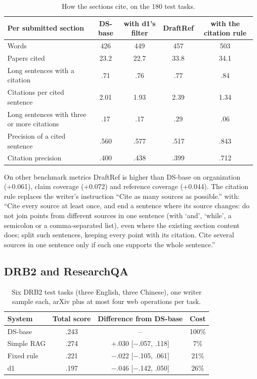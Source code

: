 \documentclass[11pt, letterpaper]{article}
\newcommand{\n}{$-$}
\begin{document}
\begin{table}[H]
\centering\footnotesize\setlength{\tabcolsep}{3pt}
\begin{tabular}{lcccc}
\toprule
Per submitted section & DS-base & with d1's filter & DraftRef & with the citation rule\\
\midrule
Words & 426 & 449 & 457 & 503\\
Papers cited & 23.2 & 22.7 & 33.8 & 34.1\\
Long sentences with a citation & .71 & .76 & .77 & .84\\
Citations per cited sentence & 2.01 & 1.93 & 2.39 & 1.34\\
Long sentences with three or more citations & .17 & .17 & .29 & .06\\
Precision of a cited sentence & .560 & .577 & .517 & .843\\
Citation precision & .400 & .438 & .399 & .712\\
\bottomrule
\end{tabular}
\caption{How the sections cite, on the 180 test tasks.}
\end{table}

On other benchmark metrics DraftRef is higher than DS-base on organization (+0.061), claim coverage
(+0.072) and reference coverage (+0.044). The citation rule replaces the writer's instruction
``Cite as many sources as possible.'' with: ``Cite every source at least once, and end a sentence
where its source changes: do not join points from different sources in one sentence (with `and',
`while', a semicolon or a comma-separated list), even where the existing section content does; split
such sentences, keeping every point with its citation. Cite several sources in one sentence only if
each one supports the whole sentence.''

\subsection{DRB2 and ResearchQA}
\label{app:benchmarks}

\begin{table}[H]
\centering\footnotesize\setlength{\tabcolsep}{3pt}
\begin{tabular}{lccc}
\toprule
System & Total score & Difference from DS-base & Cost\\
\midrule
DS-base & .243 & -- & 100\%\\
Simple RAG & .274 & +.030 [\n.057, .118] & 7\%\\
Fixed rule & .221 & \n.022 [\n.105, .061] & 21\%\\
d1 & .197 & \n.046 [\n.142, .050] & 26\%\\
\bottomrule
\end{tabular}
\caption{Six DRB2 test tasks (three English, three Chinese), one writer sample each, arXiv plus at most
four web operations per task.}
\end{table}
\end{document}
